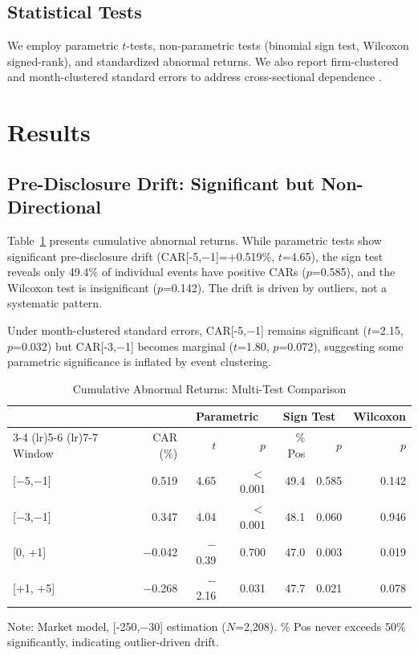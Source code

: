 \documentclass[review,authoryear]{elsarticle}
\begin{document}
\subsection{Statistical Tests}

We employ parametric $t$-tests, non-parametric tests (binomial sign test, Wilcoxon signed-rank), and standardized abnormal returns. We also report firm-clustered and month-clustered standard errors to address cross-sectional dependence \citep{kolari2010event}.

\section{Results}

\subsection{Pre-Disclosure Drift: Significant but Non-Directional}

Table~\ref{tab:car} presents cumulative abnormal returns. While parametric tests show significant pre-disclosure drift (CAR[-5,$-$1]=+0.519\%, $t$=4.65), the sign test reveals only 49.4\% of individual events have positive CARs ($p$=0.585), and the Wilcoxon test is insignificant ($p$=0.142). The drift is driven by outliers, not a systematic pattern.

Under month-clustered standard errors, CAR[-5,$-$1] remains significant ($t$=2.15, $p$=0.032) but CAR[-3,$-$1] becomes marginal ($t$=1.80, $p$=0.072), suggesting some parametric significance is inflated by event clustering.

\begin{table}[H]
\centering
\begin{threeparttable}
\caption{Cumulative Abnormal Returns: Multi-Test Comparison}
\label{tab:car}
\begin{tabular}{lrrrrrr}
\toprule
& & \multicolumn{2}{c}{Parametric} & \multicolumn{2}{c}{Sign Test} & {Wilcoxon} \\
\cmidrule(lr){3-4} \cmidrule(lr){5-6} \cmidrule(lr){7-7}
Window & CAR (\%) & $t$ & $p$ & \% Pos & $p$ & $p$ \\
\midrule
{[}$-$5,$-$1{]} & 0.519 & 4.65 & $<$0.001 & 49.4 & 0.585 & 0.142 \\
{[}$-$3,$-$1{]} & 0.347 & 4.04 & $<$0.001 & 48.1 & 0.060 & 0.946 \\
{[}0, +1{]} & $-$0.042 & $-$0.39 & 0.700 & 47.0 & 0.003 & 0.019 \\
{[}+1, +5{]} & $-$0.268 & $-$2.16 & 0.031 & 47.7 & 0.021 & 0.078 \\
\bottomrule
\end{tabular}
\begin{tablenotes}
\small
\item Note: Market model, [-250,$-$30] estimation ($N$=2,208). \% Pos never exceeds 50\% significantly, indicating outlier-driven drift.
\end{tablenotes}
\end{threeparttable}
\end{table}
\end{document}
